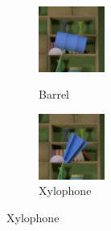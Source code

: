 \documentclass{jov}
\begin{document}
\begin{figure}
\begin{subfigure}[b]{0.14 \textwidth}
        \label{fig:libraryWithSmallBall}
    \end{subfigure}
    ~ 
    \begin{subfigure}[b]{0.14 \textwidth}
        \caption{Barrel}
        \includegraphics[width=\textwidth]{../FiguresDraft4/Figure4/Figure4_c.png}
        \label{fig:libraryWithBarrel}
    \end{subfigure}
    \begin{subfigure}[b]{0.14 \textwidth}
        \caption{Xylophone}
        \includegraphics[width=\textwidth]{../FiguresDraft4/Figure4/Figure4_d.png}

\end{subfigure}
\end{figure}
\end{document}
